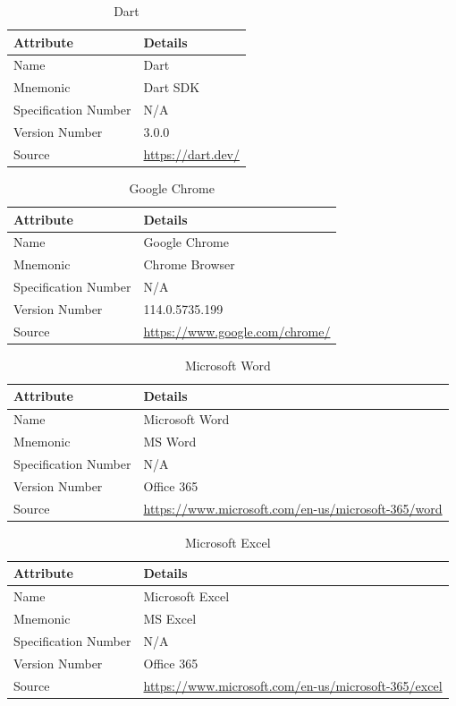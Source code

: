 \begin{table}[H]
\centering
\caption{Dart}
\label{tab:dart-metadata}
\begin{tabular}{|p{4cm}|p{10cm}|}
\hline
\textbf{Attribute} & \textbf{Details} \\
\hline
Name & Dart \\
\hline
Mnemonic & Dart SDK \\
\hline
Specification Number & N/A \\
\hline
Version Number & 3.0.0 \\
\hline
Source & \url{https://dart.dev/} \\
\hline
\end{tabular}
\end{table}

\begin{table}[H]
\centering
\caption{Google Chrome}
\label{tab:chrome-metadata}
\begin{tabular}{|p{4cm}|p{10cm}|}
\hline
\textbf{Attribute} & \textbf{Details} \\
\hline
Name & Google Chrome \\
\hline
Mnemonic & Chrome Browser \\
\hline
Specification Number & N/A \\
\hline
Version Number & 114.0.5735.199 \\
\hline
Source & \url{https://www.google.com/chrome/} \\
\hline
\end{tabular}
\end{table}

\begin{table}[H]
\centering
\caption{Microsoft Word}
\label{tab:msword-metadata}
\begin{tabular}{|p{4cm}|p{10cm}|}
\hline
\textbf{Attribute} & \textbf{Details} \\
\hline
Name & Microsoft Word \\
\hline
Mnemonic & MS Word \\
\hline
Specification Number & N/A \\
\hline
Version Number & Office 365 \\
\hline
Source & \url{https://www.microsoft.com/en-us/microsoft-365/word} \\
\hline
\end{tabular}
\end{table}

\begin{table}[H]
\centering
\caption{Microsoft Excel}
\label{tab:msexcel-metadata}
\begin{tabular}{|p{4cm}|p{10cm}|}
\hline
\textbf{Attribute} & \textbf{Details} \\
\hline
Name & Microsoft Excel \\
\hline
Mnemonic & MS Excel \\
\hline
Specification Number & N/A \\
\hline
Version Number & Office 365 \\
\hline
Source & \url{https://www.microsoft.com/en-us/microsoft-365/excel} \\
\hline
\end{tabular}
\end{table}

